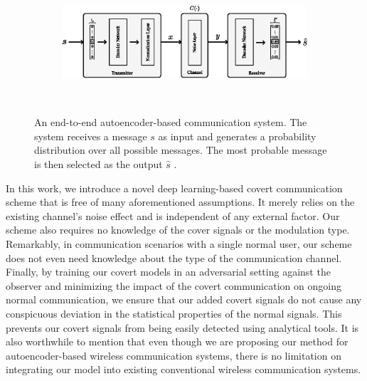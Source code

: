 \begin{figure}[tp!]
	\center
	\begin{subfigure}{0.45\textwidth}
		\includegraphics[width=\linewidth]{figs/original_autoencoder_architecture.eps}
	\end{subfigure}
	\\
	\caption{An end-to-end autoencoder-based communication system. The system receives a message \(s\) as input and generates a probability distribution over all possible messages. The most probable message is then selected as the output \(\hat{s}\) \cite{o2017introduction}.}	
	\label{fig:original_autoencoder_architecture}
\end{figure}

In this work, we introduce a novel deep learning-based covert communication scheme that is free of many aforementioned assumptions. It merely relies on the existing channel's noise effect and is independent of any external factor. Our scheme also requires no knowledge of the cover signals or the modulation type. Remarkably, in communication scenarios with a single normal user, our scheme does not even need knowledge about the type of the communication channel. Finally, by training our covert models in an adversarial setting against the observer and minimizing the impact of the covert communication on ongoing normal communication, we ensure that our added covert signals do not cause any conspicuous deviation in the statistical properties of the normal signals. This prevents our covert signals from being easily detected using analytical tools. It is also worthwhile to mention that even though we are proposing our method for autoencoder-based wireless communication systems, there is no limitation on integrating our model into existing conventional wireless communication systems.

